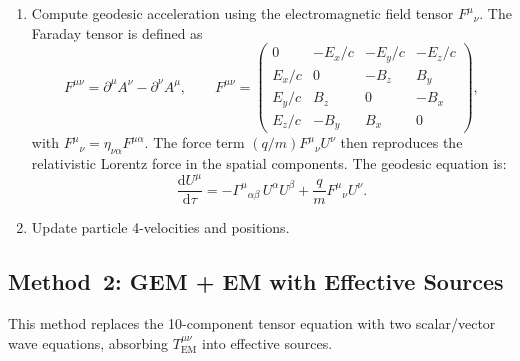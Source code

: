 \documentclass[11pt,a4paper]{article}
\newcommand{\dd}{\mathrm{d}}
\begin{document}
\begin{enumerate}
  \item Compute geodesic acceleration using the electromagnetic field tensor $F^\mu{}_\nu$.  The Faraday tensor is defined as
  \begin{equation}
    F^{\mu\nu} = \partial^\mu A^\nu - \partial^\nu A^\mu,
    \qquad
    F^{\mu\nu} =
    \begin{pmatrix}
      0      & -E_x/c & -E_y/c & -E_z/c \\
      E_x/c  &  0     & -B_z   &  B_y   \\
      E_y/c  &  B_z   &  0     & -B_x   \\
      E_z/c  & -B_y   &  B_x   &  0
    \end{pmatrix},
  \end{equation}
  with $F^\mu{}_\nu = \eta_{\nu\alpha}F^{\mu\alpha}$.  The force term $(q/m)F^\mu{}_\nu U^\nu$ then reproduces the relativistic Lorentz force in the spatial components.  The geodesic equation is:
  \begin{equation}
    \frac{\dd U^\mu}{\dd\tau} = -\Gamma^\mu{}_{\alpha\beta}\,U^\alpha U^\beta + \frac{q}{m}F^\mu{}_\nu U^\nu.
  \end{equation}

  \item Update particle 4-velocities and positions.
\end{enumerate}

\subsection{Method~2: GEM + EM with Effective Sources}

This method replaces the 10-component tensor equation with two scalar/vector wave equations, absorbing $T^{\mu\nu}_{\mathrm{EM}}$ into effective sources.
\end{document}
